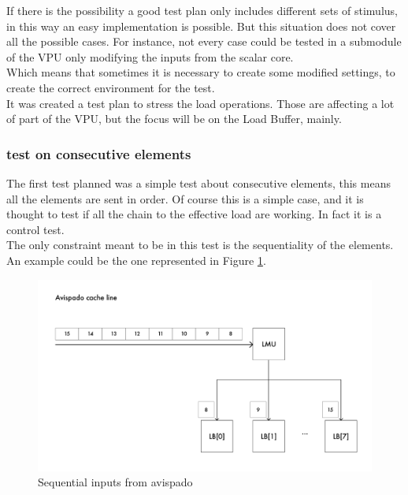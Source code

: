 If there is the possibility a good test plan only includes different sets of stimulus, in this way an easy implementation is possible. But this situation does not cover all the possible cases. For instance, not every case could be tested in a submodule of the VPU only modifying the inputs from the scalar core.\\
Which means that sometimes it is necessary to create some modified settings, to create the correct environment for the test.\\

It was created a test plan to stress the load operations. Those are affecting a lot of part of the VPU, but the focus will be on the Load Buffer, mainly.\\

\subsubsection{test on consecutive elements}
The first test planned was a simple test about consecutive elements, this means all the elements are sent in order. Of course this is a simple case, and it is thought to test if all the chain to the effective load are working. In fact it is a control test.\\

The only constraint meant to be in this test is the sequentiality of the elements.\\
An example could be the one represented in Figure \ref{cache-to-lb-seq-ex}.


\begin{figure}[H]
    \centering
    \includegraphics[scale = 0.6]{Chapter_2/img/cache-to-lb-seq-ex.png}
    \caption{Sequential inputs from avispado}
    \label{cache-to-lb-seq-ex}
\end{figure}

